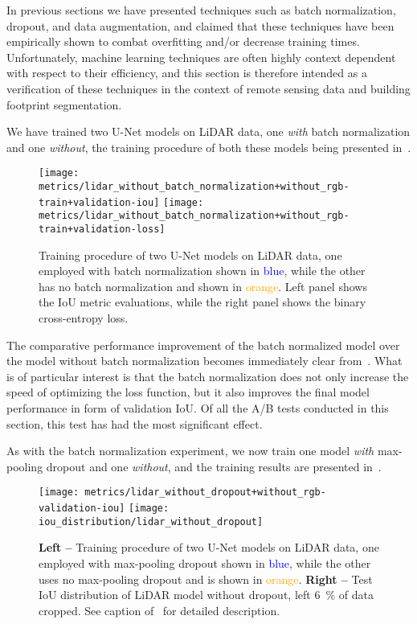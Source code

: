 In previous sections we have presented techniques such as batch normalization, dropout, and data augmentation, and claimed that these techniques have been empirically shown to combat overfitting and/or decrease training times.
Unfortunately, machine learning techniques are often highly context dependent with respect to their efficiency, and this section is therefore intended as a verification of these techniques in the context of remote sensing data and building footprint segmentation.


We have trained two U-Net models on LiDAR data, one \emph{with} batch normalization and one \emph{without}, the training procedure of both these models being presented in~.

\begin{figure}[H]
  \centering
  \texttt{[image: metrics/lidar\_without\_batch\_normalization+without\_rgb-train+validation-iou]}
  \texttt{[image: metrics/lidar\_without\_batch\_normalization+without\_rgb-train+validation-loss]}
  \caption{%
    Training procedure of two U-Net models on LiDAR data, one employed with batch normalization shown in \textcolor{blue}{blue}, while the other has no batch normalization and shown in \textcolor{orange}{orange}.
    Left panel shows the IoU metric evaluations, while the right panel shows the binary cross-entropy loss.
  }%
  \label{fig:batch-normalization-training}
\end{figure}
\vspace{-\baselineskip}
The comparative performance improvement of the batch normalized model over the model without batch normalization becomes immediately clear from~.
What is of particular interest is that the batch normalization does not only increase the speed of optimizing the loss function, but it also improves the final model performance in form of validation IoU.
Of all the A/B tests conducted in this section, this test has had the most significant effect.


As with the batch normalization experiment, we now train one model \emph{with} max-pooling dropout and one \emph{without}, and the training results are presented in~.

\begin{figure}[H]
  \centering
  \texttt{[image: metrics/lidar\_without\_dropout+without\_rgb-validation-iou]}
  \texttt{[image: iou\_distribution/lidar\_without\_dropout]}
  \caption{%
    \textbf{Left --} Training procedure of two U-Net models on LiDAR data, one employed with max-pooling dropout shown in \textcolor{blue}{blue}, while the other uses no max-pooling dropout and is shown in \textcolor{orange}{orange}.
    \textbf{Right --} Test IoU distribution of LiDAR model without dropout, left \SI{6}{\percent} of data cropped.
    See caption of~ for detailed description.
  }%
  \label{fig:dropout-training}
\end{figure}

